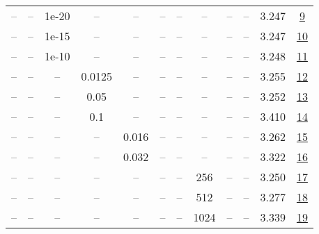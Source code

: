 \begin{table}[H]
\begin{tabular}{cccccccccccc}
-- & -- & 1e-20 & -- & -- & -- & -- & -- & -- & -- & 3.247 & \href{https://wandb.ai/stanford-mercury/optimizer-scaling/runs/sweep-130m-21B-marsae79cflr0.008-wd0.1-minlr0-warmup2000-b10.98--d6a455}{9} \\
-- & -- & 1e-15 & -- & -- & -- & -- & -- & -- & -- & 3.247 & \href{https://wandb.ai/stanford-mercury/optimizer-scaling/runs/sweep-130m-21B-marsbb9893lr0.008-wd0.1-minlr0-warmup2000-b10.98--61cf99}{10} \\
-- & -- & 1e-10 & -- & -- & -- & -- & -- & -- & -- & 3.248 & \href{https://wandb.ai/stanford-mercury/optimizer-scaling/runs/sweep-130m-21B-mars65f067lr0.008-wd0.1-minlr0-warmup2000-b10.98--00e186}{11} \\
-- & -- & -- & 0.0125 & -- & -- & -- & -- & -- & -- & 3.255 & \href{https://wandb.ai/stanford-mercury/optimizer-scaling/runs/sweep-130m-21B-mars45fc79lr0.008-wd0.1-minlr0-warmup2000-b10.98--665d81}{12} \\
-- & -- & -- & 0.05 & -- & -- & -- & -- & -- & -- & 3.252 & \href{https://wandb.ai/stanford-mercury/optimizer-scaling/runs/sweep-130m-21B-marsbb3d2dlr0.008-wd0.1-minlr0-warmup2000-b10.98--efa0b6}{13} \\
-- & -- & -- & 0.1 & -- & -- & -- & -- & -- & -- & 3.410 & \href{https://wandb.ai/stanford-mercury/optimizer-scaling/runs/sweep-130m-21B-marsef08aalr0.008-wd0.1-minlr0-warmup2000-b10.98--99e5eb}{14} \\
-- & -- & -- & -- & 0.016 & -- & -- & -- & -- & -- & 3.262 & \href{https://wandb.ai/stanford-mercury/optimizer-scaling/runs/sweep-130m-21B-marseec4ddlr0.016-wd0.1-minlr0-warmup2000-b10.98--a76048}{15} \\
-- & -- & -- & -- & 0.032 & -- & -- & -- & -- & -- & 3.322 & \href{https://wandb.ai/stanford-mercury/optimizer-scaling/runs/sweep-130m-21B-mars56ce49lr0.032-wd0.1-minlr0-warmup2000-b10.98--6ec527}{16} \\
-- & -- & -- & -- & -- & -- & -- & 256 & -- & -- & 3.250 & \href{https://wandb.ai/stanford-mercury/optimizer-scaling/runs/sweep-130m-21B-mars3da2b9lr0.008-wd0.1-minlr0-warmup2000-b10.98--21bf02}{17} \\
-- & -- & -- & -- & -- & -- & -- & 512 & -- & -- & 3.277 & \href{https://wandb.ai/stanford-mercury/optimizer-scaling/runs/sweep-130m-21B-mars41b2f4lr0.008-wd0.1-minlr0-warmup2000-b10.98--bcbde5}{18} \\
-- & -- & -- & -- & -- & -- & -- & 1024 & -- & -- & 3.339 & \href{https://wandb.ai/stanford-mercury/optimizer-scaling/runs/sweep-130m-21B-mars3adad7lr0.008-wd0.1-minlr0-warmup2000-b10.98--024b89}{19} \\

\end{tabular}
\end{table}
